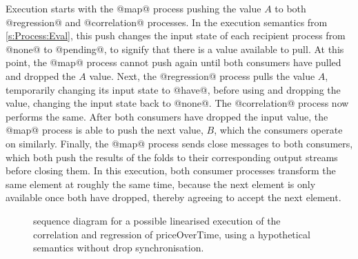Execution starts with the @map@ process pushing the value $A$ to both @regression@ and @correlation@ processes.
In the execution semantics from \cref{s:Process:Eval}, this push changes the input state of each recipient process from @none@ to @pending@, to signify that there is a value available to pull.
At this point, the @map@ process cannot push again until both consumers have pulled and dropped the $A$ value.
Next, the @regression@ process pulls the value $A$, temporarily changing its input state to @have@, before using and dropping the value, changing the input state back to @none@.
The @correlation@ process now performs the same.
After both consumers have dropped the input value, the @map@ process is able to push the next value, $B$, which the consumers operate on similarly.
Finally, the @map@ process sends close messages to both consumers, which both push the results of the folds to their corresponding output streams before closing them.
In this execution, both consumer processes transform the same element at roughly the same time, because the next element is only available once both have dropped, thereby agreeing to accept the next element.


\begin{figure}
\center
\begin{sequencediagram}









\end{sequencediagram}
\caption{sequence diagram for a possible linearised execution of the correlation and regression of priceOverTime, using a hypothetical semantics without drop synchronisation. }
\label{figs/swim/drop/priceOverTime-nosync}
\end{figure}



